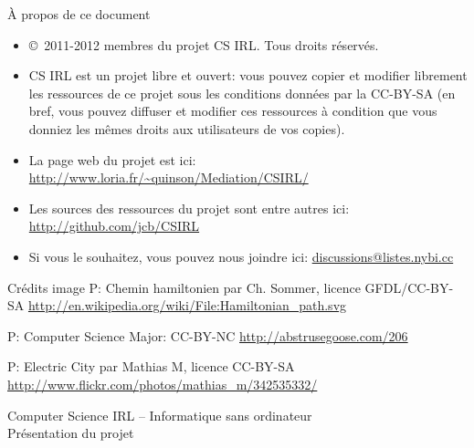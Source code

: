\documentclass[final,hyperref={pdfpagelabels=false}]{beamer}
\renewenvironment{Coupe}{   }{   }
\renewcommand*{\footnotesize}{\fontsize{\resultfootnotesizeX}{\resultfootnotesizeY}\selectfont}
\renewcommand*{\normalsize}{\fontsize{\resultnormalsizeX}{\resultnormalsizeY}\selectfont}
\renewcommand*{\large}{\fontsize{\resultlargeX}{\resultlargeY}\selectfont}
\begin{document}
\begin{Coupe}
\begin{frame}{}
  
\end{frame}

\begin{frame}
  \vspace{20\baselineskip}
  \vfill
  \begin{block}{À propos de ce document}
    \begin{itemize}
    \item \copyright\ 2011-2012 membres du projet CS IRL. Tous droits réservés.

    \item CS IRL est un \alert{projet libre et ouvert}: vous pouvez copier et
      modifier librement les ressources de ce projet sous les conditions
      données par la CC-BY-SA (en bref, vous pouvez diffuser et modifier ces
      ressources à condition que vous donniez les mêmes droits aux utilisateurs
      de vos copies).
    \item La page web du projet est ici: \url{http://www.loria.fr/~quinson/Mediation/CSIRL/}
    \item Les sources des ressources du projet sont entre autres ici: \url{http://github.com/jcb/CSIRL}
    \item Si vous le souhaitez, vous pouvez nous joindre ici: \url{discussions@listes.nybi.cc}
    \end{itemize}
  \end{block}

  \begin{block}{\normalsize Crédits image}\footnotesize
    P\pageref{img:hamiltonian}: Chemin hamiltonien par Ch. Sommer,
    licence GFDL/CC-BY-SA
    \url{http://en.wikipedia.org/wiki/File:Hamiltonian_path.svg}

    P\pageref{img:CSmajor}: Computer Science Major: CC-BY-NC
    \url{http://abstrusegoose.com/206}


    P\pageref{img:electric:city}: Electric City par Mathias M, licence CC-BY-SA
    \url{http://www.flickr.com/photos/mathias_m/342535332/}
  \end{block}
\end{frame}
\begin{frame}{Computer Science IRL -- Informatique sans ordinateur\\[-5pt]
  {\large Présentation du projet}}


\end{frame}
\end{Coupe}
\end{document}
